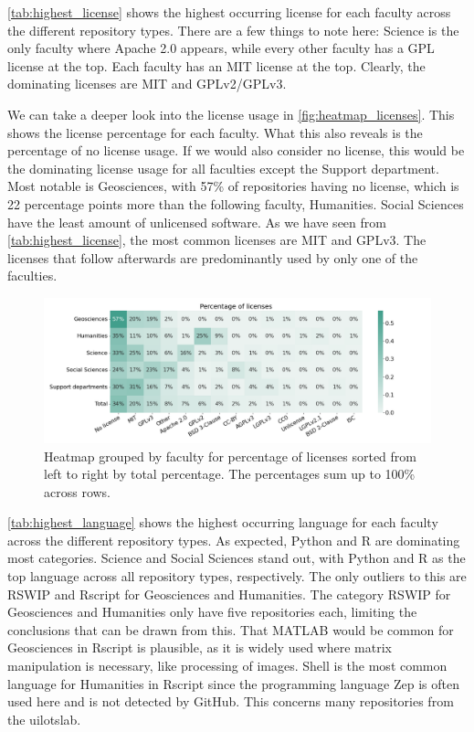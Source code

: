 

\autoref{tab:highest_license} shows the highest occurring license for each faculty across the different repository types. There are a few things to note here: Science is the only faculty where Apache 2.0 appears, while every other faculty has a GPL license at the top. Each faculty has an MIT license at the top. Clearly, the dominating licenses are MIT and GPLv2/GPLv3. 



\newpage
\newpage

We can take a deeper look into the license usage in \autoref{fig:heatmap_licenses}. This shows the license percentage for each faculty. What this also reveals is the percentage of no license usage. If we would also consider no license, this would be the dominating license usage for all faculties except the Support department. Most notable is Geosciences, with 57\% of repositories having no license, which is 22 percentage points more than the following faculty, Humanities. Social Sciences have the least amount of unlicensed software. As we have seen from \autoref{tab:highest_license}, the most common licenses are MIT and GPLv3. The licenses that follow afterwards are predominantly used by only one of the faculties.



\begin{figure}[tbph!]
\centerline{
\includegraphics[scale=0.5]{figures_results/heatmap_licenses.png}}
\caption{Heatmap grouped by faculty for percentage of licenses sorted from left to right by total percentage. The percentages sum up to 100\% across rows.
\label{fig:heatmap_licenses}}
\end{figure}


\autoref{tab:highest_language} shows the highest occurring language for each faculty across the different repository types. As expected, Python and R are dominating most categories. Science and Social Sciences stand out, with Python and R as the top language across all repository types, respectively. The only outliers to this are RSWIP and Rscript for Geosciences and Humanities. The category RSWIP for Geosciences and Humanities only have five repositories each, limiting the conclusions that can be drawn from this. That MATLAB would be common for Geosciences in Rscript is plausible, as it is widely used where matrix manipulation is necessary, like processing of images. Shell is the most common language for Humanities in Rscript since the programming language Zep is often used here and is not detected by GitHub. This concerns many repositories from the \acrfull{uilotslab}.


